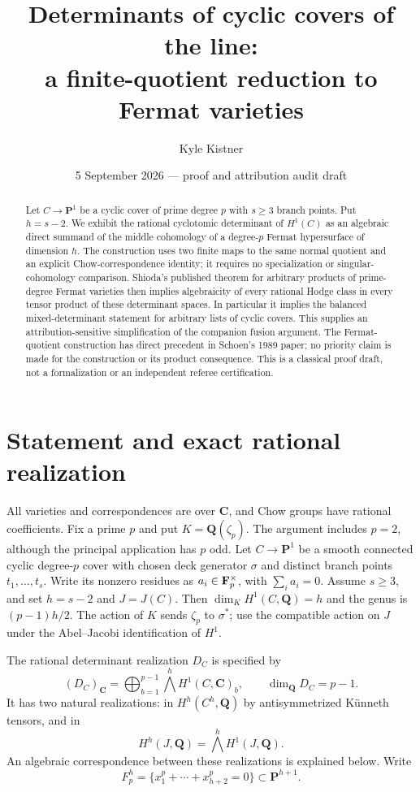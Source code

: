 \documentclass[11pt]{article}
\title{Determinants of cyclic covers of the line:\\a finite-quotient reduction to Fermat varieties}
\author{Kyle Kistner}
\date{5 September 2026 --- proof and attribution audit draft}
\theoremstyle{remark}\newtheorem{remark}[theorem]{Remark}
\newcommand{\Q}{\mathbf Q}\newcommand{\C}{\mathbf C}
\begin{document}
\maketitle
\begin{abstract}
Let $C\to\mathbf P^1$ be a cyclic cover of prime degree $p$ with $s\geq3$
branch points. Put $h=s-2$. We exhibit the rational cyclotomic determinant
of $H^1(C)$ as an algebraic direct summand of the middle cohomology of a
degree-$p$ Fermat hypersurface of dimension $h$. The construction uses two
finite maps to the same normal quotient and an explicit Chow-correspondence
identity; it requires no specialization or singular-cohomology comparison.
Shioda's published theorem for arbitrary products of prime-degree Fermat
varieties then implies algebraicity of every rational Hodge class in every
tensor product of these determinant spaces. In particular it implies the
balanced mixed-determinant statement for arbitrary lists of cyclic covers.
This supplies an attribution-sensitive simplification of the companion
fusion argument. The Fermat-quotient construction has direct precedent in
Schoen's 1989 paper; no priority claim is made for the construction or its
product consequence. This is a classical proof draft, not a formalization
or an independent referee certification.
\end{abstract}

\section{Statement and exact rational realization}
All varieties and correspondences are over $\C$, and Chow groups have
rational coefficients. Fix a prime $p$ and put $K=\Q(\zeta_p)$. The
argument includes $p=2$, although the principal application has $p$ odd.
Let $C\to\mathbf P^1$ be a smooth connected cyclic degree-$p$ cover with
chosen deck generator $\sigma$ and distinct branch points $t_1,\ldots,t_s$.
Write its nonzero residues as $a_i\in\mathbf F_p^\times$, with
$\sum_i a_i=0$. Assume $s\geq3$, and set $h=s-2$ and $J=J(C)$.
Then $\dim_K H^1(C,\Q)=h$ and the genus is $(p-1)h/2$.
The action of $K$ sends $\zeta_p$ to $\sigma^*$; use the compatible
action on $J$ under the Abel--Jacobi identification of $H^1$.

The rational determinant realization $D_C$ is specified by
\[
 (D_C)_\C=\bigoplus_{b=1}^{p-1}
       \bigwedge^h H^1(C,\C)_b,
 \qquad \dim_\Q D_C=p-1.
\]
It has two natural realizations: in $H^h(C^h,\Q)$ by antisymmetrized
K\"unneth tensors, and in
\[
 H^h(J,\Q)=\bigwedge^h H^1(J,\Q).
\]
An algebraic correspondence between these realizations is explained below.
Write
\[
 F_p^h=\{x_1^p+\cdots+x_{h+2}^p=0\}\subset\mathbf P^{h+1}.
\]
\end{document}
